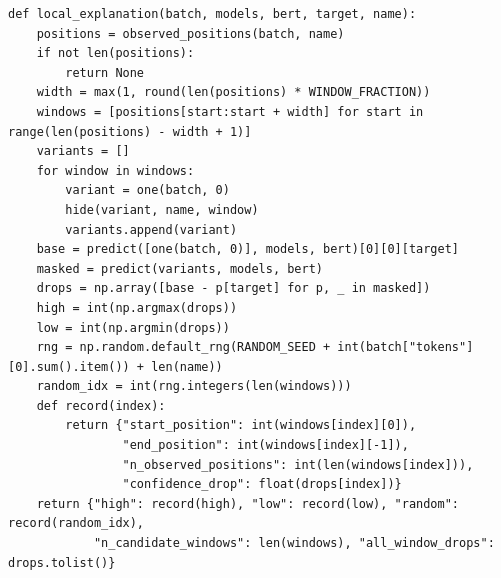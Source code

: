 \begin{lstlisting}
def local_explanation(batch, models, bert, target, name):
    positions = observed_positions(batch, name)
    if not len(positions):
        return None
    width = max(1, round(len(positions) * WINDOW_FRACTION))
    windows = [positions[start:start + width] for start in range(len(positions) - width + 1)]
    variants = []
    for window in windows:
        variant = one(batch, 0)
        hide(variant, name, window)
        variants.append(variant)
    base = predict([one(batch, 0)], models, bert)[0][0][target]
    masked = predict(variants, models, bert)
    drops = np.array([base - p[target] for p, _ in masked])
    high = int(np.argmax(drops))
    low = int(np.argmin(drops))
    rng = np.random.default_rng(RANDOM_SEED + int(batch["tokens"][0].sum().item()) + len(name))
    random_idx = int(rng.integers(len(windows)))
    def record(index):
        return {"start_position": int(windows[index][0]),
                "end_position": int(windows[index][-1]),
                "n_observed_positions": int(len(windows[index])),
                "confidence_drop": float(drops[index])}
    return {"high": record(high), "low": record(low), "random": record(random_idx),
            "n_candidate_windows": len(windows), "all_window_drops": drops.tolist()}
\end{lstlisting}
